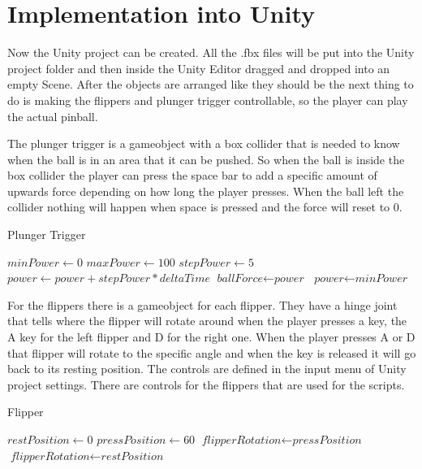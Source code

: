 \documentclass[11.5pt,oneside,a4paper]{scrartcl}
\newcounter{ct}
\begin{document}
\section{Implementation into Unity}
Now the Unity project can be created. All the .fbx files will be put into the Unity project folder and then inside the Unity Editor dragged and dropped into an empty Scene. After the objects are arranged like they should be the next thing to do is making the flippers and plunger trigger controllable, so the player can play the actual pinball.

The plunger trigger is a gameobject with a box collider that is needed to know when the ball is in an area that it can be pushed. So when the ball is inside the box collider the player can press the space bar to add a specific amount of upwards force depending on how long the player presses. When the ball left the collider nothing will happen when space is pressed and the force will reset to 0.

\begin{algorithm}
\caption{Plunger Trigger}\label{fig:code1}
\begin{algorithmic}[1]
\State $\textit{minPower} \gets 0$
\State $\textit{maxPower} \gets 100$
\State $\textit{stepPower} \gets 5$
\State $\textit{power} \gets \textit{power} + \textit{stepPower} * \textit{deltaTime}$
\EndIf 
\EndIf 
{} 
\State $\textit{ballForce} \gets \textit{power}$
\EndIf
\EndIf
\EndProcedure
{}
\State $\textit{power} \gets \textit{minPower}$
\EndProcedure
\end{algorithmic}
\end{algorithm}

For the flippers there is a gameobject for each flipper. They have a hinge joint that tells where the flipper will rotate around when the player presses a key, the A key for the left flipper and D for the right one. When the player presses A or D that flipper will rotate to the specific angle and when the key is released it will go back to its resting position. The controls are defined in the input menu of Unity project settings. There are controls for the flippers that are used for the scripts.

\begin{algorithm}
\caption{Flipper}\label{fig:code1}
\begin{algorithmic}[1]
\State $\textit{restPosition} \gets 0$
\State $\textit{pressPosition} \gets 60$
\State $\textit{flipperRotation} \gets \textit{pressPosition}$
\Else
\State $\textit{flipperRotation} \gets \textit{restPosition}$
\EndIf 
\EndProcedure
\end{algorithmic}
\end{algorithm}
\end{document}
